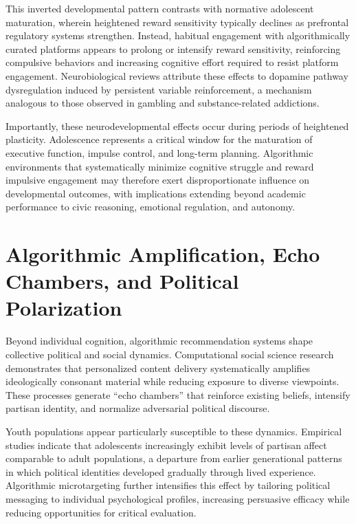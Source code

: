 \documentclass[12pt,a4paper]{report}
\begin{document}
This inverted developmental pattern contrasts with normative adolescent maturation, wherein heightened reward sensitivity typically declines as prefrontal regulatory systems strengthen. Instead, habitual engagement with algorithmically curated platforms appears to prolong or intensify reward sensitivity, reinforcing compulsive behaviors and increasing cognitive effort required to resist platform engagement. Neurobiological reviews attribute these effects to dopamine pathway dysregulation induced by persistent variable reinforcement, a mechanism analogous to those observed in gambling and substance-related addictions.

Importantly, these neurodevelopmental effects occur during periods of heightened plasticity. Adolescence represents a critical window for the maturation of executive function, impulse control, and long-term planning. Algorithmic environments that systematically minimize cognitive struggle and reward impulsive engagement may therefore exert disproportionate influence on developmental outcomes, with implications extending beyond academic performance to civic reasoning, emotional regulation, and autonomy.

\section{Algorithmic Amplification, Echo Chambers, and Political Polarization}

Beyond individual cognition, algorithmic recommendation systems shape collective political and social dynamics. Computational social science research demonstrates that personalized content delivery systematically amplifies ideologically consonant material while reducing exposure to diverse viewpoints. These processes generate ``echo chambers'' that reinforce existing beliefs, intensify partisan identity, and normalize adversarial political discourse.

Youth populations appear particularly susceptible to these dynamics. Empirical studies indicate that adolescents increasingly exhibit levels of partisan affect comparable to adult populations, a departure from earlier generational patterns in which political identities developed gradually through lived experience. Algorithmic microtargeting further intensifies this effect by tailoring political messaging to individual psychological profiles, increasing persuasive efficacy while reducing opportunities for critical evaluation.
\end{document}
